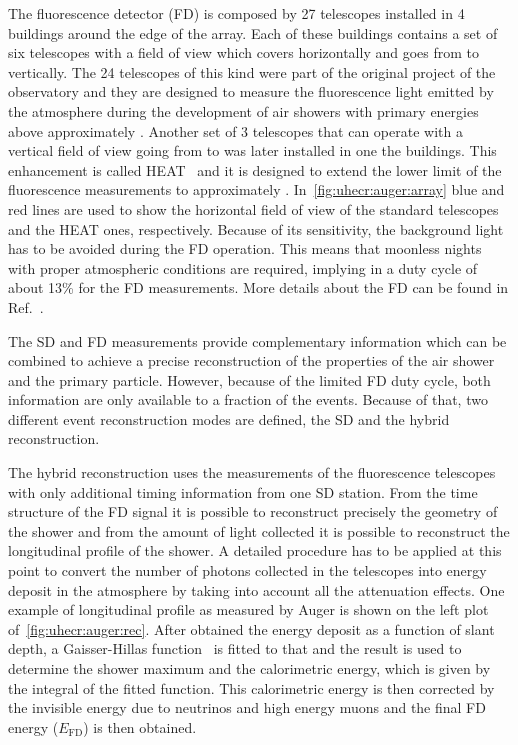 The fluorescence detector (FD) is composed by 27 telescopes installed in
4 buildings around the edge of the array. Each of these buildings contains
a set of six telescopes with a field of view which covers  horizontally
and goes from  to  vertically. The 24 telescopes of this kind
were part of the original project of the observatory and they are designed to measure
the fluorescence light emitted by the atmosphere during the development of air showers
with primary energies above approximately . Another set of 3 telescopes
that can operate with a vertical field of view going from  to 
was later installed in one the buildings.
This enhancement is called HEAT~\cite{Mathes:2011zz} and it is
designed to extend the lower limit of the fluorescence measurements to approximately .
In~\cref{fig:uhecr:auger:array}
blue and red lines are used to show the horizontal field of view of the standard telescopes
and the HEAT ones, respectively. Because of its sensitivity, the background light has to be avoided
during the FD operation. This means that moonless nights with proper atmospheric conditions
are required, implying in a duty cycle of about 13\% for the FD measurements. 
More details about the FD can be found in Ref.~\cite{Abraham:2009pm}.

The SD and FD measurements provide complementary information 
which can be combined to achieve a precise reconstruction of the
properties of the air shower and the primary particle.
However, because of the limited FD duty cycle, both information
are only available to a fraction of the events. Because of that,
two different event reconstruction modes are defined, the SD and
the hybrid reconstruction.

The hybrid reconstruction uses the measurements of the
fluorescence telescopes with only additional timing information
from one SD station. From the time structure of the FD signal it is
possible to reconstruct precisely the geometry of the shower and
from the amount of light collected it is possible to reconstruct the
longitudinal profile of the shower. A detailed procedure has to be applied
at this point to convert the number of photons collected in the telescopes
into energy deposit in the atmosphere by
taking into account all the attenuation effects.
One example of longitudinal profile as measured by Auger is shown
on the left plot of~\cref{fig:uhecr:auger:rec}.
After obtained the energy deposit as a function of slant depth,
a Gaisser-Hillas function~\cite{GaisserHillas1977} is fitted to that and the result
is used to determine the shower maximum \xmax and the calorimetric energy,
which is given by the integral of the fitted function. This calorimetric
energy is then corrected by the invisible energy due to neutrinos and high energy
muons and the final FD energy ($E_\text{FD}$) is then obtained.


